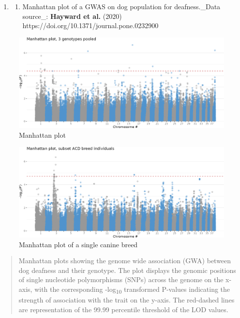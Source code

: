 \documentclass[a4paper,10pt]{article}
\begin{document}
\begin{enumerate}
  \def\labelenumi{\arabic{enumi}.}
  \item
        \begin{enumerate}
          \def\labelenumii{\alph{enumii}.}
          \tightlist
          \item
                Manhattan plot of a GWAS on dog population for deafness.\_Data
                source\_: \textbf{Hayward et al.} (2020)
                https://doi.org/10.1371/journal.pone.0232900
        \end{enumerate}
\end{enumerate}

\begin{figure}
  \centering
  \includegraphics[width=\linewidth]{Figures/manhattan_dogs.png}
  \caption{Manhattan plot}
\end{figure}

\begin{figure}
  \centering
  \includegraphics[width=\linewidth]{Figures/manhattan_filter_acd.png}
  \caption{Manhattan plot of a single canine breed}
\end{figure}

\begin{quote}
  Manhattan plots showing the genome wide association (GWA) between dog
  deafness and their genotype. The plot displays the genomic positions of
  single nucleotide polymorphisms (SNPs) across the genome on the x-axis,
  with the corresponding -log\textsubscript{10} transformed P-values
  indicating the strength of association with the trait on the y-axis. The
  red-dashed lines are representation of the 99.99 percentile threshold of
  the LOD values.
\end{quote}
\end{document}
